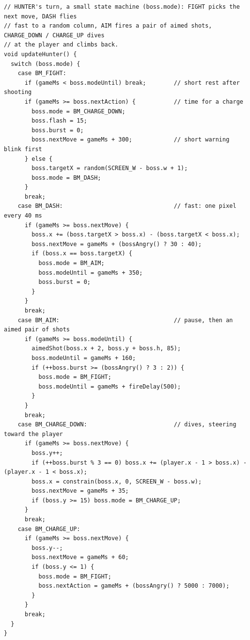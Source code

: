 \documentclass[11pt,a4paper]{article}
\begin{document}
\begin{lstlisting}[language=Arduino]
// HUNTER's turn, a small state machine (boss.mode): FIGHT picks the next move, DASH flies
// fast to a random column, AIM fires a pair of aimed shots, CHARGE_DOWN / CHARGE_UP dives
// at the player and climbs back.
void updateHunter() {
  switch (boss.mode) {
    case BM_FIGHT:
      if (gameMs < boss.modeUntil) break;        // short rest after shooting
      if (gameMs >= boss.nextAction) {           // time for a charge
        boss.mode = BM_CHARGE_DOWN;
        boss.flash = 15;
        boss.burst = 0;
        boss.nextMove = gameMs + 300;            // short warning blink first
      } else {
        boss.targetX = random(SCREEN_W - boss.w + 1);
        boss.mode = BM_DASH;
      }
      break;
    case BM_DASH:                                // fast: one pixel every 40 ms
      if (gameMs >= boss.nextMove) {
        boss.x += (boss.targetX > boss.x) - (boss.targetX < boss.x);
        boss.nextMove = gameMs + (bossAngry() ? 30 : 40);
        if (boss.x == boss.targetX) {
          boss.mode = BM_AIM;
          boss.modeUntil = gameMs + 350;
          boss.burst = 0;
        }
      }
      break;
    case BM_AIM:                                 // pause, then an aimed pair of shots
      if (gameMs >= boss.modeUntil) {
        aimedShot(boss.x + 2, boss.y + boss.h, 85);
        boss.modeUntil = gameMs + 160;
        if (++boss.burst >= (bossAngry() ? 3 : 2)) {
          boss.mode = BM_FIGHT;
          boss.modeUntil = gameMs + fireDelay(500);
        }
      }
      break;
    case BM_CHARGE_DOWN:                         // dives, steering toward the player
      if (gameMs >= boss.nextMove) {
        boss.y++;
        if (++boss.burst % 3 == 0) boss.x += (player.x - 1 > boss.x) - (player.x - 1 < boss.x);
        boss.x = constrain(boss.x, 0, SCREEN_W - boss.w);
        boss.nextMove = gameMs + 35;
        if (boss.y >= 15) boss.mode = BM_CHARGE_UP;
      }
      break;
    case BM_CHARGE_UP:
      if (gameMs >= boss.nextMove) {
        boss.y--;
        boss.nextMove = gameMs + 60;
        if (boss.y <= 1) {
          boss.mode = BM_FIGHT;
          boss.nextAction = gameMs + (bossAngry() ? 5000 : 7000);
        }
      }
      break;
  }
}


\end{lstlisting}
\end{document}
